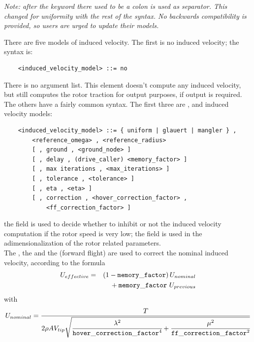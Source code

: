 \emph{Note: after the keyword  there used to be
a colon is used as separator.
This changed for uniformity with the rest of the syntax.
No backwards compatibility is provided, so users are urged to update
their models.
}

\noindent
There are five models of induced velocity. 
The first is no induced velocity; the syntax is:
\begin{verbatim}
    <induced_velocity_model> ::= no
\end{verbatim}
There is no argument list. This element doesn't compute any induced
velocity, but still computes the rotor traction for output purposes,
if output is required.
The others have a fairly common syntax.  The first three are
,  and  induced velocity
models:
\begin{verbatim}
    <induced_velocity_model> ::= { uniform | glauert | mangler } , 
        <reference_omega> , <reference_radius> 
        [ , ground , <ground_node> ]
        [ , delay , (drive_caller) <memory_factor> ]
        [ , max iterations , <max_iterations> ]
        [ , tolerance , <tolerance> ]
        [ , eta , <eta> ]
        [ , correction , <hover_correction_factor> ,
            <ff_correction_factor> ]
\end{verbatim}
the  field is used to decide whether to inhibit
or not the induced velocity computation if the rotor speed is very low;
the  field is used in the adimensionalization
of the rotor related parameters. \\
The , the  
and the  (forward flight) are
used to correct the nominal induced velocity, according to the formula
\begin{eqnarray*}
	U_{effective} & = &
	\left( 1 - \mathtt{memory\_factor} \right) 
		U_{nominal} \\
	& & \mbox{} + \mathtt{memory\_factor} \ U_{previous}
\end{eqnarray*}
with
\begin{displaymath}
	U_{nominal} = \frac{T}{2 \rho A V_{tip} \sqrt{
		\cfrac{\lambda^2}{\mathtt{hover\_correction\_factor}^4}
		+ \cfrac{\mu^2}{\mathtt{ff\_correction\_factor}^2}
	}}
\end{displaymath}

